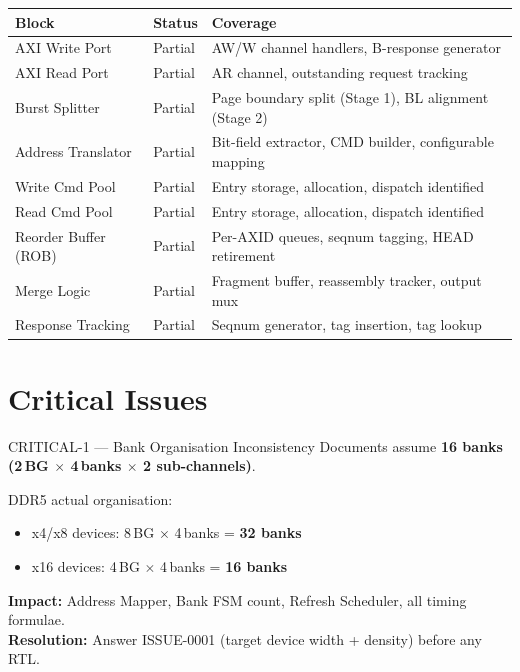 \documentclass[10pt,a4paper]{article}
\newcommand{\Th}[1]{\cellcolor{thbg}\textbf{\small\color{acc1}#1}}
\newcommand{\RA}{\rowcolor{white}}
\newcommand{\RB}{\rowcolor{altbg}}
\begin{document}
\begin{center}
\begin{tabularx}{\linewidth}{@{} l l X @{}}
\toprule
\Th{Block} & \Th{Status} & \Th{Coverage} \\
\midrule
\RA AXI Write Port       & Partial & AW/W channel handlers, B-response generator \\
\RB AXI Read Port        & Partial & AR channel, outstanding request tracking \\
\RA Burst Splitter       & Partial & Page boundary split (Stage 1), BL alignment (Stage 2) \\
\RB Address Translator   & Partial & Bit-field extractor, CMD builder, configurable mapping \\
\RA Write Cmd Pool       & Partial & Entry storage, allocation, dispatch identified \\
\RB Read Cmd Pool        & Partial & Entry storage, allocation, dispatch identified \\
\RA Reorder Buffer (ROB) & Partial & Per-AXID queues, seqnum tagging, HEAD retirement \\
\RB Merge Logic          & Partial & Fragment buffer, reassembly tracker, output mux \\
\RA Response Tracking    & Partial & Seqnum generator, tag insertion, tag lookup \\
\bottomrule
\end{tabularx}
\end{center}

\section{Critical Issues}

\begin{critbox}{CRITICAL-1 --- Bank Organisation Inconsistency}
Documents assume \textbf{16 banks (2\,BG $\times$ 4\,banks $\times$ 2 sub-channels)}.

DDR5 actual organisation:
\begin{itemize}
  \item x4/x8 devices: 8\,BG $\times$ 4\,banks = \textbf{32 banks}
  \item x16 devices: 4\,BG $\times$ 4\,banks = \textbf{16 banks}
\end{itemize}
\textbf{Impact:} Address Mapper, Bank FSM count, Refresh Scheduler, all timing formulae.\\
\textbf{Resolution:} Answer ISSUE-0001 (target device width + density) before any RTL.
\end{critbox}
\end{document}
